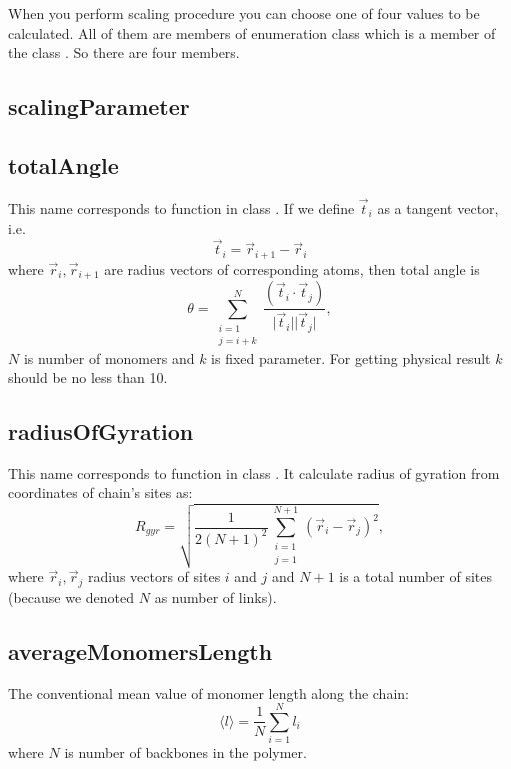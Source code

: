 \documentclass[12pt]{article}
\begin{document}
\begin{mySection}\label{sec:enumClassObservable}

When you perform scaling procedure you can choose one of four values to be calculated. All of them are members of enumeration class  which is a member of the class .
So there are four members.
\subsection{scalingParameter}

\subsection{totalAngle}
This name corresponds to function  in class . If we define $\vec{t}_i$ as a tangent vector, i.e.
\begin{equation}
\vec{t}_i = \vec{r}_{i+1}-\vec{r}_i
\end{equation}
where $\vec{r}_i, \vec{r}_{i+1}$ are radius vectors of corresponding atoms, then total angle is
\begin{equation}
\theta = \sum_{\substack {i=1 \\ j=i+k}}^N\frac{(\vec{t}_i\cdot \vec{t}_j)}{\vert\vec{t}_i\vert\vert\vec{t}_j\vert},
\label{eq:totalAngle}
\end{equation}
$N$ is number of monomers and $k$ is fixed parameter. For getting physical result $k$ should be no less than 10.

\subsection{radiusOfGyration}
This name corresponds to function  in class . It calculate radius of gyration from coordinates of chain's sites as:
\begin{equation}
R_{gyr} = \sqrt{\frac{1}{2(N+1)^2} \sum_{\substack {i=1 \\ j=1}}^{N+1} \left( \vec{r}_i-\vec{r}_j \right)^2},
\end{equation}
where $\vec{r}_i, \vec{r}_j$ radius vectors of sites $i$ and $j$ and $N+1$ is a total number of sites (because we denoted $N$ as number of links). 
\subsection{averageMonomersLength}
The conventional mean value of monomer length along the chain:
\begin{equation}
\langle l\rangle = \frac{1}{N} \sum_{i=1}^N l_i
\end{equation}
where $N$ is number of backbones in the polymer.
\end{mySection}
\end{document}
